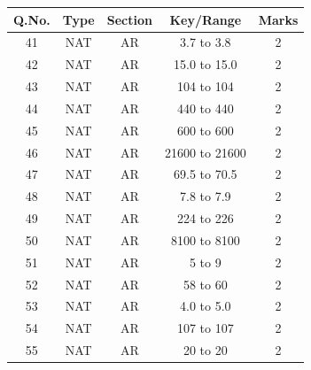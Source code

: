 \documentclass{article}
\begin{document}
\renewcommand{\arraystretch}{2.2} %
\setlength{\tabcolsep}{20pt} %
\hspace{1.5cm}
\begin{tabular}{|c|c|c|c|c|}
\hline
\rowcolor{orange!30}
Q.No. & Type & Section & Key/Range & Marks \\
\hline
41 & NAT & AR & 3.7 to 3.8 & 2 \\
\hline
42 & NAT & AR & 15.0 to 15.0 & 2 \\
\hline
43 & NAT & AR & 104 to 104 & 2 \\
\hline
44 & NAT & AR & 440 to 440 & 2 \\
\hline
45 & NAT & AR & 600 to 600 & 2 \\
\hline
46 & NAT & AR & 21600 to 21600 & 2 \\
\hline
47 & NAT & AR & 69.5 to 70.5 & 2 \\
\hline
48 & NAT & AR & 7.8 to 7.9 & 2 \\
\hline
49 & NAT & AR & 224 to 226 & 2 \\
\hline
50 & NAT & AR & 8100 to 8100 & 2 \\
\hline
51 & NAT & AR & 5 to 9 & 2 \\
\hline
52 & NAT & AR & 58 to 60 & 2 \\
\hline
53 & NAT & AR & 4.0 to 5.0 & 2 \\
\hline
54 & NAT & AR & 107 to 107 & 2 \\
\hline
55 & NAT & AR & 20 to 20 & 2 \\
\hline
\end{tabular}

 
\end{document}
